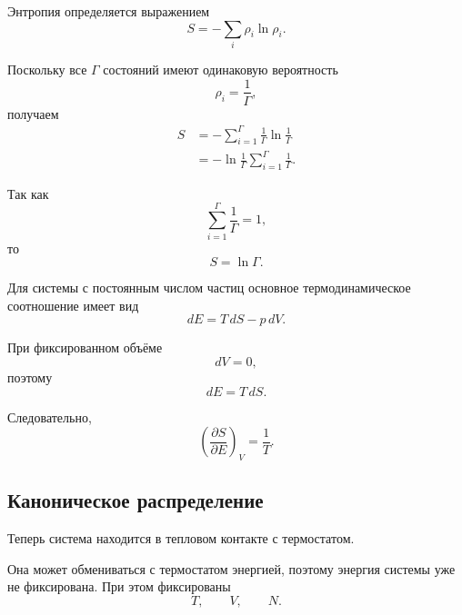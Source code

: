 \documentclass[../final.tex]{subfiles}
\begin{document}
Энтропия определяется выражением
%
\begin{equation*}
    S
    =
    -\sum_i
    \rho_i\ln\rho_i.
\end{equation*}

Поскольку все $\Gamma$ состояний имеют одинаковую вероятность
%
\begin{equation*}
    \rho_i
    =
    \frac{1}{\Gamma},
\end{equation*}
%
получаем
%
\begin{align*}
    S
    &=
    -\sum_{i=1}^{\Gamma}
    \frac{1}{\Gamma}
    \ln\frac{1}{\Gamma}
    \\[4pt]
    &=
    -\ln\frac{1}{\Gamma}
    \sum_{i=1}^{\Gamma}
    \frac{1}{\Gamma}.
\end{align*}

Так как
%
\begin{equation*}
    \sum_{i=1}^{\Gamma}
    \frac{1}{\Gamma}
    =
    1,
\end{equation*}
%
то
%
\[
    \boxed{
        S = \ln\Gamma
    }.
\]

Для системы с постоянным числом частиц основное термодинамическое
соотношение имеет вид
%
\begin{equation*}
    dE
    =
    T\,dS
    -
    p\,dV.
\end{equation*}

При фиксированном объёме
%
\begin{equation*}
    dV = 0,
\end{equation*}
%
поэтому
%
\begin{equation*}
    dE
    =
    T\,dS.
\end{equation*}

Следовательно,
%
\[
    \boxed{
        \left(
            \frac{\partial S}{\partial E}
        \right)_V
        =
        \frac{1}{T}
    }.
\]


\subsection{Каноническое распределение}

Теперь система находится в тепловом контакте с термостатом.

Она может обмениваться с термостатом энергией, поэтому энергия системы
уже не фиксирована. При этом фиксированы
%
\begin{equation*}
    T,
    \qquad
    V,
    \qquad
    N.
\end{equation*}
\end{document}

